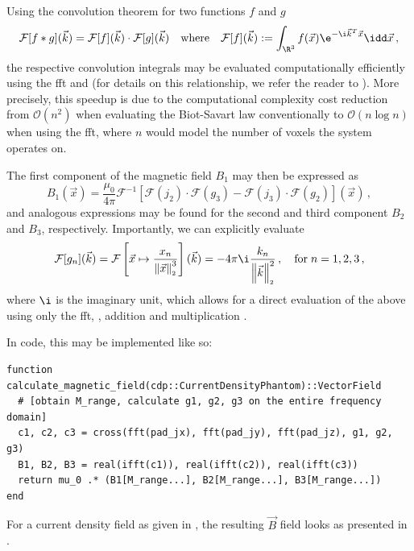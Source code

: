 \documentclass[10pt]{article}
\renewcommand{\norm}[1]{\left\lVert#1\right\rVert_{\scriptscriptstyle 2}}
\begin{document}
  Using the convolution theorem for two functions $f$ and $g$
  $$\mathcal{F}[f * g](\vec{k}) = \mathcal{F}[f](\vec{k}) \cdot \mathcal{F}[g](\vec{k}) \quad\text{where}\quad \mathcal{F}[f](\vec{k}) := \int_{\R^3} f(\vec{x}) \e^{-\i \vec{k}^T \vec{x}}\idd\vec{x}\,,$$
  the respective convolution integrals may be evaluated computationally efficiently using the \gls{fft} and  (for details on this relationship, we refer the reader to \cite{2022-convolution-theorem}).
  More precisely, this speedup is due to the computational complexity cost reduction from $\mathcal{O}(n^2)$ when evaluating the Biot-Savart law conventionally to $\mathcal{O}(n \log n)$ when using the \gls{fft}, where $n$ would model the number of voxels the system operates on.

  The first component of the magnetic field $B_1$ may then be expressed as
  $$B_1(\vec{x}) = \frac{\mu_0}{4\pi}\mathcal{F}^{-1}\left[\mathcal{F}(j_2) \cdot \mathcal{F}(g_3) - \mathcal{F}(j_3) \cdot \mathcal{F}(g_2)\right](\vec{x})\,,$$
  and analogous expressions may be found for the second and third component $B_2$ and $B_3$, respectively.
  Importantly, we can explicitly evaluate
  $$\mathcal{F}[g_n](\vec{k}) = \mathcal{F}\left[\vec{x} \mapsto \frac{x_n}{\norm{\vec{x}}^3}\right](\vec{k}) = -4\pi\i \frac{k_n}{\norm{\vec{k}}^2}\,, \quad\text{for}\; n=1,2,3\,,$$
  where $\i$ is the imaginary unit,
  which allows for a direct evaluation of the above using only the \gls{fft}, , addition and multiplication \parencite{2020-biot-savart-evaluation-fft}.

  In code, this may be implemented like so:
  \begin{verbatim}
function calculate_magnetic_field(cdp::CurrentDensityPhantom)::VectorField
  # [obtain M_range, calculate g1, g2, g3 on the entire frequency domain]
  c1, c2, c3 = cross(fft(pad_jx), fft(pad_jy), fft(pad_jz), g1, g2, g3)
  B1, B2, B3 = real(ifft(c1)), real(ifft(c2)), real(ifft(c3))
  return mu_0 .* (B1[M_range...], B2[M_range...], B3[M_range...])
end
  \end{verbatim}

  For a current density field as given in , the resulting $\vec{B}$ field looks as presented in .
\end{document}
